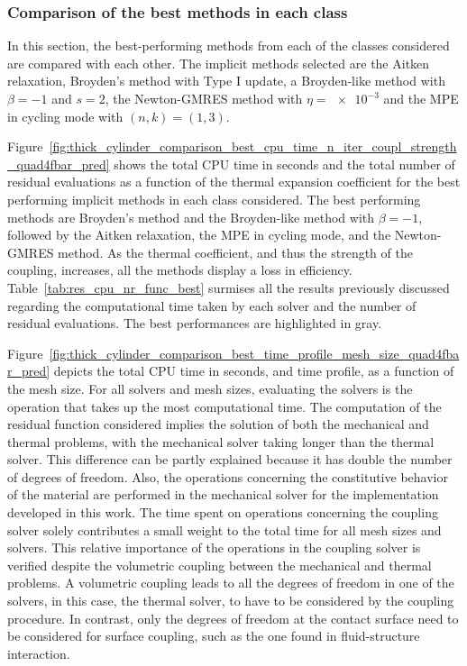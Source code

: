\FloatBarrier

\subsubsection{Comparison of the best methods in each class}

In this section, the best-performing methods from each of the classes considered are compared with each other.
The implicit methods selected are the Aitken relaxation, Broyden's method with Type I update, a Broyden-like method with \(\beta=-1\) and \(s=2\), the Newton-GMRES method with \(\eta=\num{e-3}\) and the MPE in cycling mode with \((n,k)=(1,3)\).

Figure~\ref{fig:thick_cylinder_comparison_best_cpu_time_n_iter_coupl_strength_quad4fbar_pred} shows the total CPU time in seconds and the total number of residual evaluations as a function of the thermal expansion coefficient for the best performing implicit methods in each class considered.
The best performing methods are Broyden's method and the Broyden-like method with \(\beta=-1\), followed by the Aitken relaxation, the MPE in cycling mode, and the Newton-GMRES method.
As the thermal coefficient, and thus the strength of the coupling, increases, all the methods display a loss in efficiency.
Table~\ref{tab:res_cpu_nr_func_best} surmises all the results previously discussed regarding the computational time taken by each solver and the number of residual evaluations.
The best performances are highlighted in gray.

Figure~\ref{fig:thick_cylinder_comparison_best_time_profile_mesh_size_quad4fbar_pred} depicts the total CPU time in seconds, and time profile, as a function of the mesh size.
For all solvers and mesh sizes, evaluating the solvers is the operation that takes up the most computational time.
The computation of the residual function considered implies the solution of both the mechanical and thermal problems, with the mechanical solver taking longer than the thermal solver.
This difference can be partly explained because it has double the number of degrees of freedom.
Also, the operations concerning the constitutive behavior of the material are performed in the mechanical solver for the implementation developed in this work.
The time spent on operations concerning the coupling solver solely contributes a small weight to the total time for all mesh sizes and solvers.
This relative importance of the operations in the coupling solver is verified despite the volumetric coupling between the mechanical and thermal problems.
A volumetric coupling leads to all the degrees of freedom in one of the solvers, in this case, the thermal solver, to have to be considered by the coupling procedure.
In contrast, only the degrees of freedom at the contact surface need to be considered for surface coupling, such as the one found in fluid-structure interaction.

